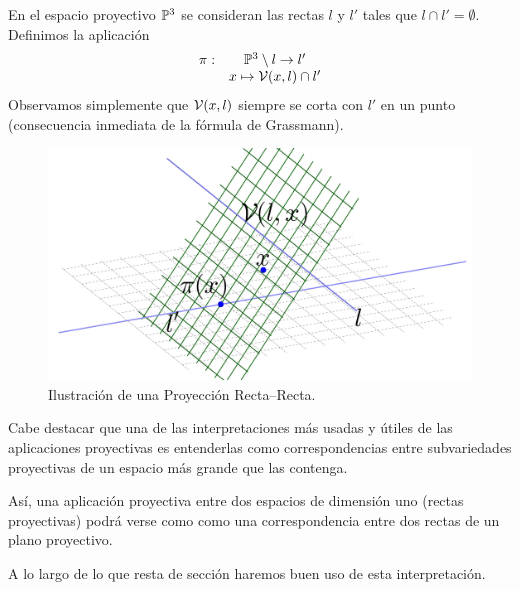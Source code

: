 \begin{exa}
	En el espacio proyectivo $\mathbb{P}^3$ se consideran las rectas $l$ y $l'$ tales que $l\cap l'=\emptyset$. Definimos la aplicación
	\[\begin{array}{cc}
	\pi:&\mathbb{P}^3\setminus l\to l'\\
	&x\mapsto\mathcal{V}(x,l)\cap l'
	\end{array}\]
	Observamos simplemente que $\mathcal{V}(x,l)$ siempre se corta con $l'$ en un punto (consecuencia inmediata de la fórmula de Grassmann).
	\begin{figure}[h]
		\centering
		\includegraphics[scale=.3]{Graficos/rectaRecta.png}
		\caption{Ilustración de una Proyección Recta--Recta.}
		\label{C4_rectaRecta}
	\end{figure}
\end{exa}

\begin{obs}
	Cabe destacar que una de las interpretaciones más usadas y útiles de las aplicaciones proyectivas es entenderlas como correspondencias entre subvariedades proyectivas de un espacio más grande que las contenga.
	
	Así, una aplicación proyectiva entre dos espacios de dimensión uno (rectas proyectivas) podrá verse como como una correspondencia entre dos rectas de un plano proyectivo.
	
	A lo largo de lo que resta de sección haremos buen uso de esta interpretación.
\end{obs}

